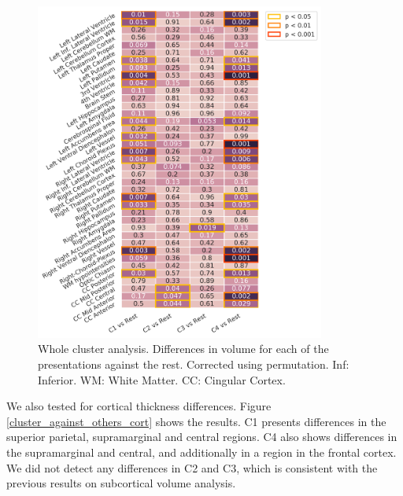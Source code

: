 \begin{figure}[!htbp]
\centering
\includegraphics[width=0.85\textwidth]{figures/cimlr/clusteragainstothers.png}
\caption[Whole cluster analysis.]{Whole cluster analysis. Differences in volume for each of the presentations against the rest. Corrected using permutation. Inf: Inferior. WM: White Matter. CC: Cingular Cortex.}
\label{cluster_against_others}
\end{figure}

We also tested for cortical thickness differences. Figure \ref{cluster_against_others_cort} shows the results. C1 presents differences in the superior parietal, supramarginal and central regions. C4 also shows differences in the supramarginal and central, and additionally in a region in the frontal cortex. We did not detect any differences in C2 and C3, which is consistent with the previous results on subcortical volume analysis. \\

